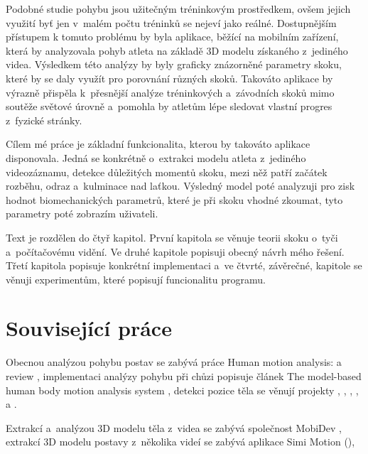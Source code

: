Podobné studie pohybu jsou užitečným tréninkovým prostředkem, ovšem jejich využití byť jen v~malém počtu tréninků se nejeví jako reálné. Dostupnějším přístupem k tomuto problému by byla aplikace, běžící na mobilním zařízení, která by analyzovala pohyb atleta na základě 3D modelu získaného z~jediného videa. Výsledkem této analýzy by byly graficky znázorněné parametry skoku, které by se daly využít pro porovnání různých skoků. Takováto aplikace by výrazně přispěla k~přesnější analýze tréninkových a~závodních skoků mimo soutěže světové úrovně a~pomohla by atletům lépe sledovat vlastní progres z~fyzické stránky.

Cílem mé práce je základní funkcionalita, kterou by takováto aplikace disponovala. Jedná se konkrétně o~extrakci modelu atleta z~jediného videozáznamu, detekce důležitých momentů skoku, mezi něž patří začátek rozběhu, odraz a~kulminace nad laťkou. Výsledný model poté analyzuji pro zisk hodnot biomechanických parametrů, které je při skoku vhodné zkoumat, tyto parametry poté zobrazím uživateli.

Text je rozdělen do čtyř kapitol. První kapitola se věnuje teorii skoku o~tyči a~počítačovému vidění. Ve druhé kapitole popisuji obecný návrh mého řešení. Třetí kapitola popisuje konkrétní implementaci a~ve čtvrté, závěrečné, kapitole se věnuji experimentům, které popisují funcionalitu programu.



\section*{Související práce}

Obecnou analýzou pohybu postav se zabývá práce Human motion analysis: a review \citep{609859}, implementaci analýzy pohybu při chůzi popisuje článek The model-based human body motion analysis system \citep{CHANG20001067}, detekci pozice těla se věnují projekty \citet{OpenPose}, \citet{sun2019deep}, \citet{pishchulin2016deepcut}, \citet{Toshev_2014}, \citet{} a \citet{fang2018rmpe}.

Extrakcí a~analýzou 3D modelu těla z~videa se zabývá společnost MobiDev \citep{MobiDev}, extrakcí 3D modelu postavy z~několika videí se zabývá aplikace Simi Motion (\cite{SIMI}), 